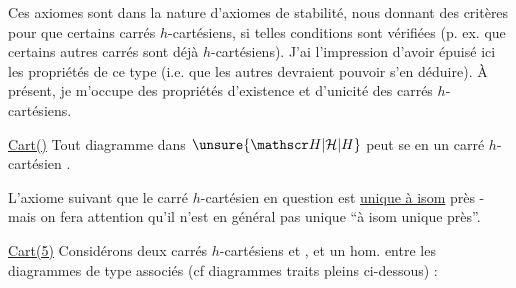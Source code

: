 Ces axiomes sont dans la nature d'axiomes de stabilité, nous donnant des critères  pour que certains carrés  $h$-cartésiens, si telles conditions sont vérifiées (p. ex. que certains autres carrés sont déjà $h$-cartésiens). J'ai l'impression d'avoir  épuisé ici les propriétés  de ce type (i.e. que les autres devraient pouvoir s'en déduire). À présent, je m'occupe des propriétés d'existence et d'unicité des carrés $h$-cartésiens.

\margin{$\vert$}
\uline{Cart()}  Tout diagramme
dans $\unsure{\mathscr H|\mathcal H|H}$ peut se  en un carré $h$-cartésien
.

L'axiome suivant   que le carré $h$-cartésien en question est  \uline{unique à isom} près - mais on fera attention qu'il n'est en général pas unique ``à isom unique près''.

\uline{Cart(5)}  Considérons deux  carrés $h$-cartésiens
et
, et un hom.  entre les diagrammes de type
associés (cf diagrammes traits pleins ci-dessous) :

